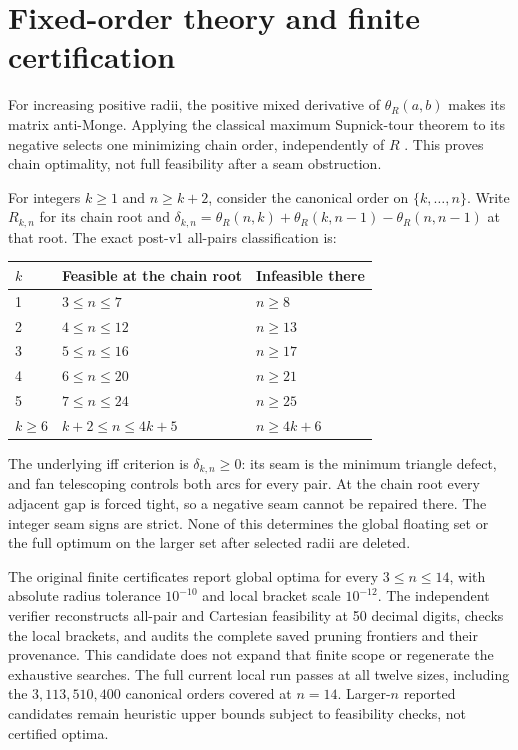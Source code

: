 \documentclass[11pt]{article}
\theoremstyle{definition}\newtheorem{definition}[theorem]{Definition}
\theoremstyle{remark}\newtheorem{remark}[theorem]{Remark}
\begin{document}
\section{Fixed-order theory and finite certification}

For increasing positive radii, the positive mixed derivative of
$\theta_R(a,b)$ makes its matrix anti-Monge. Applying the classical maximum
Supnick-tour theorem to its negative selects one minimizing chain order,
independently of $R$ \cite{supnick,survey}. This proves chain optimality,
not full feasibility after a seam obstruction.

For integers $k\ge1$ and $n\ge k+2$, consider the canonical order on
$\{k,\ldots,n\}$. Write $R_{k,n}$ for its chain
root and
$\delta_{k,n}=\theta_R(n,k)+\theta_R(k,n-1)-\theta_R(n,n-1)$ at that root.
The exact post-v1 all-pairs classification \cite{fixed} is:
\begin{center}\begin{tabular}{lll}\toprule
$k$ & Feasible at the chain root & Infeasible there\\\midrule
1 & $3\le n\le7$ & $n\ge8$\\
2 & $4\le n\le12$ & $n\ge13$\\
3 & $5\le n\le16$ & $n\ge17$\\
4 & $6\le n\le20$ & $n\ge21$\\
5 & $7\le n\le24$ & $n\ge25$\\
$k\ge6$ & $k+2\le n\le4k+5$ & $n\ge4k+6$\\\bottomrule
\end{tabular}\end{center}
The underlying iff criterion is $\delta_{k,n}\ge0$: its seam is the minimum
triangle defect, and fan telescoping controls both arcs for every pair.
At the chain root every adjacent gap is forced tight, so a negative seam
cannot be repaired there. The integer seam signs are strict. None of this
determines the global floating set or the full optimum on the larger set
after selected radii are deleted.

The original finite certificates report global optima for every
$3\le n\le14$, with absolute radius tolerance $10^{-10}$ and local bracket
scale $10^{-12}$. The independent verifier reconstructs all-pair and Cartesian
feasibility at 50 decimal digits, checks the local brackets, and audits the
complete saved pruning frontiers and their provenance. This candidate does
not expand that finite scope or regenerate the exhaustive searches.
The full current local run passes at all twelve sizes, including the
$3{,}113{,}510{,}400$ canonical orders covered at $n=14$.
Larger-$n$ reported candidates remain heuristic upper bounds subject to
feasibility checks, not certified optima.
\end{document}
